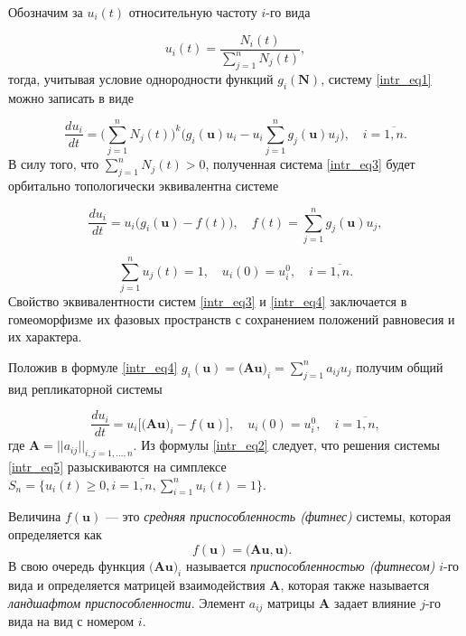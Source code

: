Обозначим за $u_{i}(t)$ относительную частоту $i$-го вида

\begin{equation}
u_{i}(t) = \frac{N_{i}(t)}{\sum\limits_{j = 1}^{n}N_{j}(t)},
\label{intr_eq2}
\end{equation} 
тогда, учитывая условие однородности функций $g_{i}(\mathbf {N})$, систему \eqref{intr_eq1} можно записать в виде

\begin{equation}
\frac{du_{i}}{dt} = \Bigg(\sum\limits_{j = 1}^{n}N_{j}(t)\Bigg)^{k} \Bigg(g_{i}(\mathbf {u})u_{i} - u_{i}\sum\limits_{j = 1}^{n}g_{j}(\mathbf {u})u_{j}\Bigg), \quad i = \overline{1, n}.
\label{intr_eq3}
\end{equation} 
В силу того, что $\sum\limits_{j = 1}^{n}N_{j}(t) > 0$, полученная система \eqref{intr_eq3} будет орбитально топологически эквивалентна \cite{Arnold} системе

\begin{equation}
\frac{du_{i}}{dt} = u_{i}\Big(g_{i}(\mathbf {u}) - f(t)\Big), \quad f(t) = \sum\limits_{j = 1}^{n}g_{j}(\mathbf {u})u_{j},
\label{intr_eq4}
\end{equation}

$$
\sum\limits_{j = 1}^{n}u_{j}(t) = 1, \quad u_{i}(0) = u_{i}^{0}, \quad i = \overline{1, n}.
$$ 
Свойство эквивалентности систем \eqref{intr_eq3} и \eqref{intr_eq4} заключается в гомеоморфизме их фазовых пространств с сохранением положений равновесия и их характера.

Положив в формуле \eqref{intr_eq4} $g_{i}(\mathbf {u}) = \Big(\mathbf {Au}\Big)_{i} = \sum\limits_{j = 1}^{n}a_{ij}u_{j}$ получим общий вид репликаторной системы

\begin{equation}
\frac{du_{i}}{dt} = u_{i}\Bigg[\Big(\mathbf {Au}\Big)_{i} - f(\mathbf {u})\Bigg], \quad u_{i}(0) = u_{i}^{0}, \quad i = \overline{1, n},
\label{intr_eq5}
\end{equation}
где $\mathbf {A} = ||a_{ij}||_{i, j = 1,...,n}$. Из формулы \eqref{intr_eq2} следует, что решения системы \eqref{intr_eq5} разыскиваются на симплексе $S_{n} = \Big\{u_{i}(t) \ge 0, i = \overline{1, n}, \sum\limits_{i = 1}^{n}u_{i}(t) = 1\Big\}$.

Величина $f(\mathbf {u})$ --- это \textit{средняя приспособленность (фитнес)} системы, которая определяется как
$$
\quad f(\mathbf {u}) = \Big(\mathbf {Au, u}\Big).
$$
В свою очередь функция $\Big(\mathbf {Au}\Big)_{i}$ называется \textit{приспособленностью (фитнесом)} $i$-го вида и определяется матрицей взаимодействия $\mathbf {A}$, которая также называется \textit{ландшафтом приспособленности}. Элемент $a_{ij}$ матрицы $\mathbf {A}$ задает влияние $j$-го вида на вид с номером $i$.

